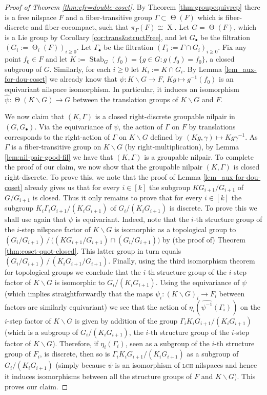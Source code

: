 \documentclass[a4paper,12pt,reqno]{amsart}
\theoremstyle{definition}
\def\to{\rightarrow}
\DeclareMathOperator{\stab}{Stab}
\DeclareMathOperator{\tran}{\Theta}
\DeclareMathOperator{\ns}{X}
\begin{document}
\begin{proof}[Proof of Theorem \ref{thm:cfr=double-coset}]
By Theorem \ref{thm:groupequivrep} there is a free nilspace $F$ and a  fiber-transitive group $\Gamma\subset \tran(F)$ which is fiber-discrete and  fiber-cocompact, such that $\pi_\Gamma(F)\cong \ns$. Let $G=\tran(F)$, which is a Lie group by Corollary \ref{cor:trans&structFree}, and let $G_\bullet$ be the filtration $(G_i:=\tran_i(F))_{i\geq 0}$. Let $\Gamma_\bullet$ be the filtration $(\Gamma_i:=\Gamma\cap G_i)_{i\geq 0}$. Fix any point $f_0\in F$ and let $K:=\stab_G(f_0)=\{g\in G:g(f_0)=f_0\}$, a closed subgroup of $G$. Similarly, for each $i\ge 0$ let $K_i:=K\cap G_i$. By Lemma \ref{lem_aux-for-dou-coset} we already know that $\psi:K\backslash G\to F$, $Kg\mapsto g^{-1}(f_0)$ is an equivariant nilspace isomorphism. In particular, it induces an isomorphism $\widehat{\psi}:\tran(K\backslash G)\to G$ between the translation groups of $K\backslash G$ and $F$.

We now claim that $(K,\Gamma)$ is a closed right-discrete groupable nilpair in $(G,G_\bullet)$. Via the equivariance of $\psi$, the action of $\Gamma$ on $F$ by translations corresponds to the right-action of $\Gamma$ on $K\backslash G$ defined by $(Kg,\gamma)\mapsto Kg\gamma^{-1}$. As  $\Gamma$ is a fiber-transitive group on $K\backslash G$ (by right-multiplication), by Lemma \ref{lem:nil-pair-good-fil} we have that $(K,\Gamma)$ is a groupable nilpair. To complete the proof of our claim, we now show that the groupable nilpair $(K,\Gamma)$ is closed right-discrete. To prove this, we note that the proof of Lemma \ref{lem_aux-for-dou-coset} already gives us that for every $i\in [k]$ the subgroup $KG_{i+1}/G_{i+1}$ of $G/G_{i+1}$ is closed. Thus it only remains to prove that for every $i\in [k]$ the subgroup $K_i\Gamma_i G_{i+1}/(K_i G_{i+1})$ of $G_i/(K_iG_{i+1})$ is discrete. To prove this we shall use again that $\psi$ is equivariant. Indeed, note that the $i$-th structure group of the $i$-step nilspace factor of $K\backslash G$ is isomorphic as a topological group to $(G_i/G_{i+1})\,/\, \big((KG_{i+1}/G_{i+1})\cap (G_i/G_{i+1})\big)$ by (the proof of) Theorem \ref{thm:coset-quot-closed}. This latter group in turn equals $(G_i/G_{i+1})\,/\, (K_iG_{i+1}/G_{i+1})$. Finally, using the third isomorphism theorem for topological groups we conclude that the $i$-th structure group of the $i$-step  factor of $K\backslash G$ is isomorphic to $G_i/(K_iG_{i+1})$. Using the equivariance of $\psi$ (which implies straightforwardly that the maps $\psi_i:(K\backslash G)_i\to F_i$ between factors are similarly equivariant) we see that the action of $\eta_i(\widehat{\psi^{-1}}(\Gamma_i))$ on the $i$-step factor of $K\backslash G$ is given by addition of the group  $\Gamma_iK_iG_{i+1}/(K_iG_{i+1})$ (which is a subgroup of $G_i/(K_iG_{i+1})$, the $i$-th structure group of the $i$-step factor of $K\backslash G$). Therefore, if $\eta_i(\Gamma_i)$, seen as a subgroup of the $i$-th structure group of $F_i$, is discrete, then so is $\Gamma_iK_iG_{i+1}/(K_iG_{i+1})$ as a subgroup of $G_i/(K_iG_{i+1})$ (simply because $\psi$ is an isomorphism of \textsc{lch} nilspaces and hence it induces isomorphisms between all the structure groups of $F$ and $K\backslash G$). This proves our claim.


\end{proof}
\end{document}
